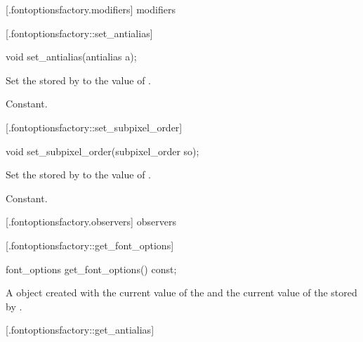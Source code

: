  [\iotwod.fontoptionsfactory.modifiers] { 
modifiers}

 [\iotwod.fontoptionsfactory::set_antialias] 
{}

%
%
\begin{itemdecl}
void set_antialias(antialias a);
\end{itemdecl}
\begin{itemdescr}
	\pnum
	\effects
	Set the  stored by  to the value of .
	
	\pnum
	\complexity
	Constant.
\end{itemdescr}

 [\iotwod.fontoptionsfactory::set_subpixel_order] 
{}

%
%
\begin{itemdecl}
void set_subpixel_order(subpixel_order so);
\end{itemdecl}
\begin{itemdescr}
	\pnum
	\effects
	Set the  stored by  to the value of 
	.
	
	\pnum
	\complexity
	Constant.
\end{itemdescr}

 [\iotwod.fontoptionsfactory.observers] { 
observers}

 [\iotwod.fontoptionsfactory::get_font_options] 
{}

%
%
\begin{itemdecl}
font_options get_font_options() const;
\end{itemdecl}
\begin{itemdescr}
	\pnum
	\returns
	A  object created with the current value of the 
	 and the current value of the  
	stored by .
\end{itemdescr}

 [\iotwod.fontoptionsfactory::get_antialias] 
{}

